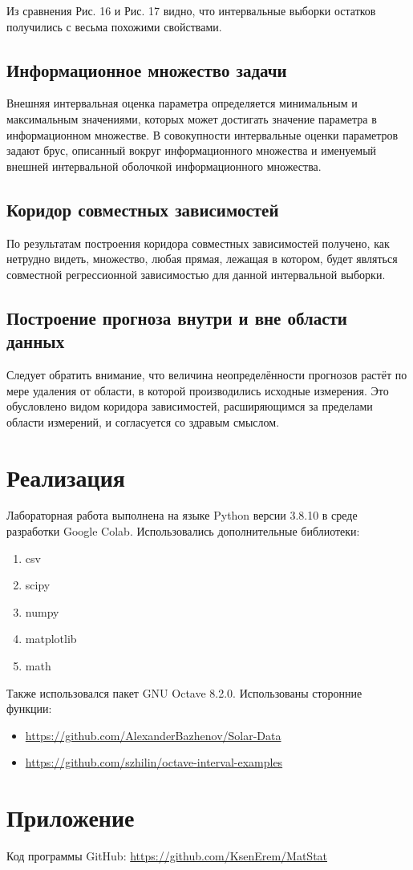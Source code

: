 \documentclass{article}
\begin{document}
	Из сравнения Рис. 16 и Рис. 17 видно, что интервальные выборки остатков получились с весьма похожими свойствами.
	
	\subsection{Информационное множество задачи}
	
	Внешняя интервальная оценка параметра определяется минимальным и максимальным значениями, которых может достигать значение параметра в информационном множестве. В совокупности интервальные оценки параметров задают брус, описанный вокруг информационного множества и именуемый внешней интервальной оболочкой информационного множества.
	
	\subsection{Коридор совместных зависимостей}
	
	По результатам построения коридора совместных зависимостей получено, как нетрудно видеть, множество, любая прямая, лежащая в котором, будет являться совместной регрессионной зависимостью для данной интервальной выборки.
	
	\subsection{Построение прогноза внутри и вне области данных}
	
	Следует обратить внимание, что величина неопределённости прогнозов растёт по мере удаления от области, в которой производились исходные измерения. Это обусловлено видом коридора зависимостей, расширяющимся за пределами области измерений, и согласуется со здравым смыслом.

	\newpage
	\section{Реализация}
	
	Лабораторная работа выполнена на языке Python версии 3.8.10 в среде разработки Google Colab. Использовались дополнительные библиотеки:
\begin{enumerate}
    \item csv
    \item scipy
    \item numpy
    \item matplotlib
    \item math
\end{enumerate}
Также использовался пакет GNU Octave 8.2.0. Использованы сторонние функции: 
	\begin{itemize}
		\item \url{https://github.com/AlexanderBazhenov/Solar-Data}
		\item \url{https://github.com/szhilin/octave-interval-examples}
	\end{itemize}

\section{Приложение}
\noindent Код программы GitHub: \url{https://github.com/KsenErem/MatStat}
	
\end{document}
